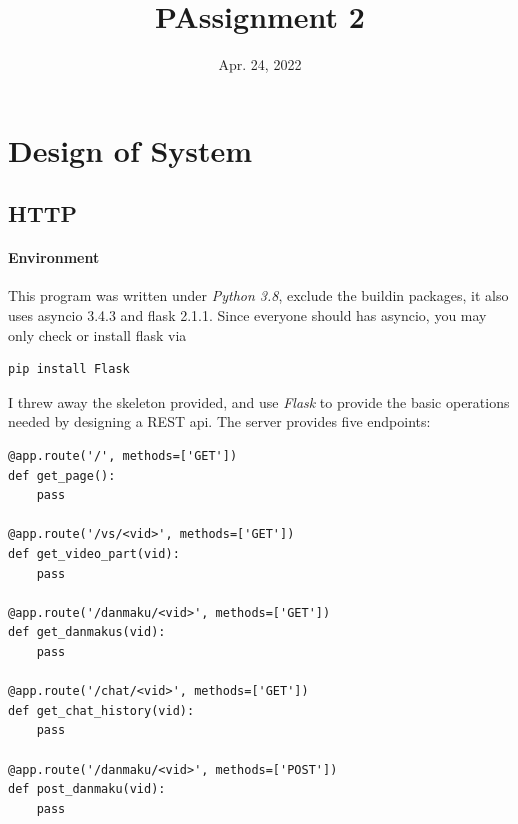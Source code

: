 \documentclass[onecolumn, oneside, ctexart]{SUSTechHomework}
\title{PAssignment 2}
\date{Apr. 24, 2022}
\begin{document}
\maketitle



\section{Design of System}

\subsection{HTTP}

\paragraph{Environment} This program was written under \emph{Python 3.8}, exclude the buildin packages, it also uses asyncio 3.4.3 and flask 2.1.1. Since everyone should has asyncio, you may only check or install flask via
\begin{verbatim}
pip install Flask
\end{verbatim}

I threw away the skeleton provided, and use \emph{Flask} to provide the basic operations needed by designing a REST api. The server provides five endpoints:
\begin{verbatim}
@app.route('/', methods=['GET'])
def get_page():
    pass
    
@app.route('/vs/<vid>', methods=['GET'])
def get_video_part(vid):
    pass
    
@app.route('/danmaku/<vid>', methods=['GET'])
def get_danmakus(vid):
    pass
    
@app.route('/chat/<vid>', methods=['GET'])
def get_chat_history(vid):
    pass
    
@app.route('/danmaku/<vid>', methods=['POST'])
def post_danmaku(vid):
    pass
\end{verbatim}
\end{document}
